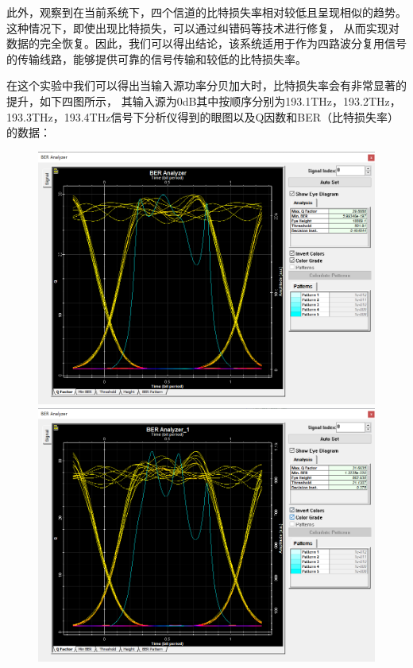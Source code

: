 \documentclass[12pt]{article}
\begin{document}
此外，观察到在当前系统下，四个信道的比特损失率相对较低且呈现相似的趋势。这种情况下，即使出现比特损失，可以通过纠错码等技术进行修复，
从而实现对数据的完全恢复。因此，我们可以得出结论，该系统适用于作为四路波分复用信号的传输线路，能够提供可靠的信号传输和较低的比特损失率。

在这个实验中我们可以得出当输入源功率分贝加大时，比特损失率会有非常显著的提升，如下四图所示，
其输入源为0dB其中按顺序分别为193.1THz，193.2THz，193.3THz，193.4THz信号下分析仪得到的眼图以及Q因数和BER（比特损失率）的数据：

\begin{figure}[H]
    \begin{minipage}[t]{0.5\linewidth}
        \centering
        \includegraphics[scale=0.2]{sweep2Q1.png}
        \caption{}
        \label{fig:side:a}
      \end{minipage}%
      \begin{minipage}[t]{0.5\linewidth}
        \centering
        \includegraphics[scale=0.2]{sweep2Q2.png}

\end{minipage}
\end{figure}
\end{document}
